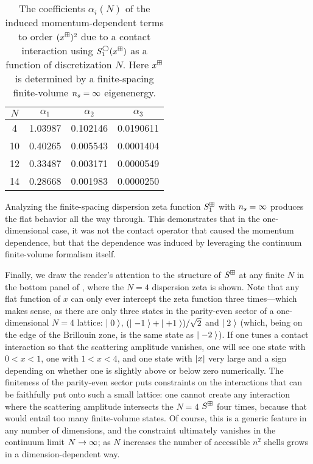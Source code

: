 \begin{table}
    \caption{
    The coefficients $\alpha_i(N)$ of the induced momentum-dependent terms to order $(x^\boxplus)^2$ due to a contact interaction using $S^\bigcirc_1(x^\boxplus)$ as a function of discretization $N$.
    Here $x^\boxplus$ is determined by a finite-spacing finite-volume ${n_s}=\infty$ eigenenergy.}
    \label{tab:induced terms in 1 d}
    \begin{tabular}{S[table-format=2.1]S[table-format=2.6]S[table-format=2.7]S[table-format=2.8]}
{$N$} & {$\alpha_1$} & {$\alpha_2$} & {$\alpha_3$} \\  &   1.03987  & 0.102146 & 0.0190611 \\
    10  &   0.40265  & 0.005543 & 0.0001404 \\
    12  &   0.33487  & 0.003171 & 0.0000549 \\
    14  &   0.28668  & 0.001983 & 0.0000250 \\
    \end{tabular}
\end{table}


Analyzing the finite-spacing dispersion zeta function $S^{\boxplus}_1$ with ${n_s}=\infty$ produces the flat behavior all the way through.
This demonstrates that in the one-dimensional case, it was not the contact operator that caused the momentum dependence, but that the dependence was induced by leveraging the continuum finite-volume formalism itself.

Finally, we draw the reader's attention to the structure of $S^\boxplus$ at any finite $N$ in the bottom panel of , where the $N=4$ dispersion zeta is shown.
Note that any flat function of $x$ can only ever intercept the zeta function three times---which makes sense, as there are only three states in the parity-even sector of a one-dimensional $N=4$ lattice: $\left|\;0\;\right\rangle$, $(\left|\;-1\;\right\rangle+\left|\;+1\;\right\rangle)/\sqrt{2}$ and $\left|\;2\;\right\rangle$ (which, being on the edge of the Brillouin zone, is the same state as $\left|\;-2\;\right\rangle$).
If one tunes a contact interaction so that the scattering amplitude vanishes, one will see one state with $0<x<1$, one with $1<x<4$, and one state with $\left| x \right|$ very large and a sign depending on whether one is slightly above or below zero numerically.
The finiteness of the parity-even sector puts constraints on the interactions that can be faithfully put onto such a small lattice: one cannot create any interaction where the scattering amplitude intersects the $N=4$ $S^{\boxplus}$ four times, because that would entail too many finite-volume states.
Of course, this is a generic feature in any number of dimensions, and the constraint ultimately vanishes in the continuum limit $N\rightarrow\infty$; as $N$ increases the number of accessible $n^2$ shells grows in a dimension-dependent way.
